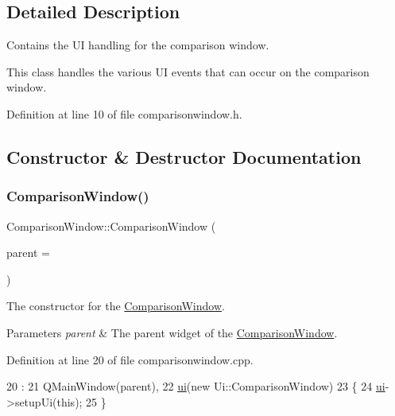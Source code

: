 \subsection{Detailed Description}
Contains the UI handling for the comparison window.

This class handles the various UI events that can occur on the comparison window. 

Definition at line 10 of file comparisonwindow.\+h.



\subsection{Constructor \& Destructor Documentation}
\mbox{\label{class_comparison_window_addc31fc48e96a30d630166cb377c3869}} 
\subsubsection{\texorpdfstring{Comparison\+Window()}{ComparisonWindow()}}
{\footnotesize\ttfamily Comparison\+Window\+::\+Comparison\+Window (\begin{DoxyParamCaption}\item[{Q\+Widget $\ast$}]{parent = {} }\end{DoxyParamCaption})\hspace{0.3cm}{\ttfamily [explicit]}}



The constructor for the \mbox{\hyperlink{class_comparison_window}{Comparison\+Window}}. 


\begin{DoxyParams}{Parameters}
{\em parent} & The parent widget of the \mbox{\hyperlink{class_comparison_window}{Comparison\+Window}}. \\
\hline
\end{DoxyParams}


Definition at line 20 of file comparisonwindow.\+cpp.


\begin{DoxyCode}
20                                                   :
21     QMainWindow(parent),
22     \mbox{\hyperlink{class_comparison_window_a18eb77b5884a928a8b958907d1565acf}{ui}}(\textcolor{keyword}{new} Ui::ComparisonWindow)
23 \{
24     \mbox{\hyperlink{class_comparison_window_a18eb77b5884a928a8b958907d1565acf}{ui}}->setupUi(\textcolor{keyword}{this});
25 \}
\end{DoxyCode}
\mbox{\label{class_comparison_window_a8f22c497b2b938378a4a51dc7e3ae8f2}} 
